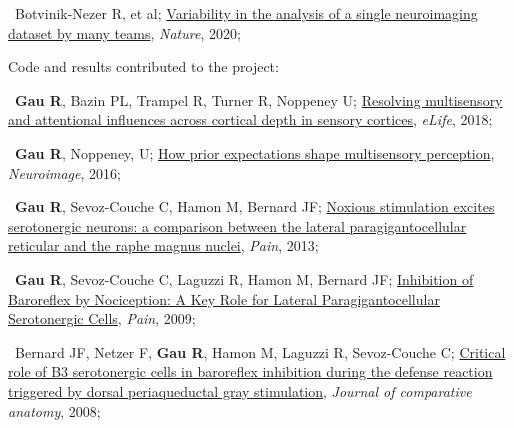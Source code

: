 
\textbullet~Botvinik-Nezer R, et al; 
\href{https://osf.io/zac8t/}{Variability in the analysis of a single neuroimaging dataset by many teams}, 
\textit{Nature}, 
2020; 

Code and results contributed to the project:

\smallskip

\textbullet~\textbf{Gau R}, Bazin PL, Trampel R, Turner R, Noppeney U; 
\href{https://osf.io/x3uak/}{Resolving multisensory and attentional influences across cortical depth in sensory cortices}, 
\textit{eLife}, 
2018;


\textbullet~\textbf{Gau R}, Noppeney, U; 
\href{https://osf.io/8frkq/}{How prior expectations shape multisensory perception}, 
\textit{Neuroimage}, 
2016; 


\textbullet~\textbf{Gau R}, Sevoz-Couche C, Hamon M, Bernard JF; 
\href{https://osf.io/ktcv9/}{Noxious stimulation excites serotonergic neurons: a comparison between the lateral paragigantocellular reticular and the raphe magnus nuclei}, 
\textit{Pain}, 
2013; 

\textbullet~\textbf{Gau R}, Sevoz-Couche C, Laguzzi R, Hamon M, Bernard JF; 
\href{https://osf.io/cqhvb/}{Inhibition of Baroreflex by Nociception: A Key Role for Lateral Paragigantocellular Serotonergic Cells}, 
\textit{Pain}, 
2009; 

\textbullet~Bernard JF, Netzer F, \textbf{Gau R}, Hamon M, Laguzzi R, Sevoz-Couche C; 
\href{https://osf.io/rcvuj/}{Critical role of B3 serotonergic cells in baroreflex inhibition during the defense reaction triggered by dorsal periaqueductal gray stimulation}, 
\textit{Journal of comparative anatomy}, 
2008; 

